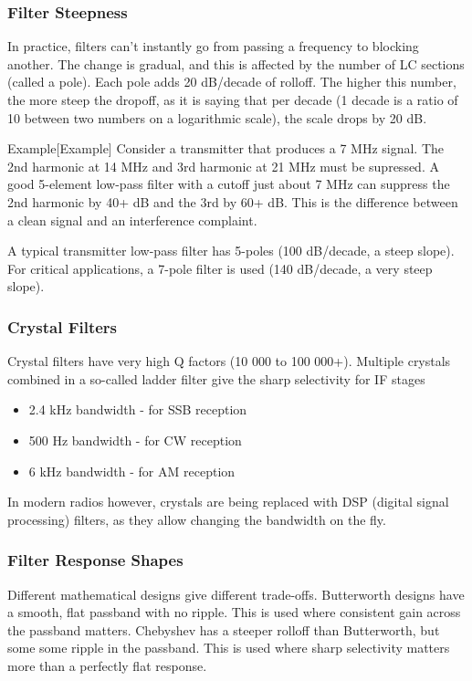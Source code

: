 \documentclass{article}
\begin{document}
\subsubsection{Filter Steepness}
In practice, filters can't instantly go from passing a frequency to blocking another. The change is gradual, and this is affected by the number of LC sections (called a pole). Each pole adds 20 dB/decade of rolloff. The higher this number, the more steep the dropoff, as it is saying that per decade (1 decade is a ratio of 10 between two numbers on a logarithmic scale), the scale drops by 20 dB.
\begin{callout}{Example}[Example]
    Consider a transmitter that produces a 7 MHz signal. The 2nd harmonic at 14 MHz and 3rd harmonic at 21 MHz must be supressed. A good 5-element low-pass filter with a cutoff just about 7 MHz can suppress the 2nd harmonic by 40+ dB and the 3rd by 60+ dB. This is the difference between a clean signal and an interference complaint.
\end{callout}

A typical transmitter low-pass filter has 5-poles (100 dB/decade, a steep slope). For critical applications, a 7-pole filter is used (140 dB/decade, a very steep slope).

\subsubsection{Crystal Filters}
Crystal filters have very high Q factors (10 000 to 100 000+). Multiple crystals combined in a so-called ladder filter give the sharp selectivity for IF stages
\begin{itemize}
    \item 2.4 kHz bandwidth - for SSB reception
    \item 500 Hz bandwidth - for CW reception
    \item 6 kHz bandwidth - for AM reception
\end{itemize}
In modern radios however, crystals are being replaced with DSP (digital signal processing) filters, as they allow changing the bandwidth on the fly.

\subsubsection{Filter Response Shapes}
Different mathematical designs give different trade-offs. Butterworth designs have a smooth, flat passband with no ripple. This is used where consistent gain across the passband matters. Chebyshev has a steeper rolloff than Butterworth, but some some ripple in the passband. This is used where sharp selectivity matters more than a perfectly flat response.
\end{document}
